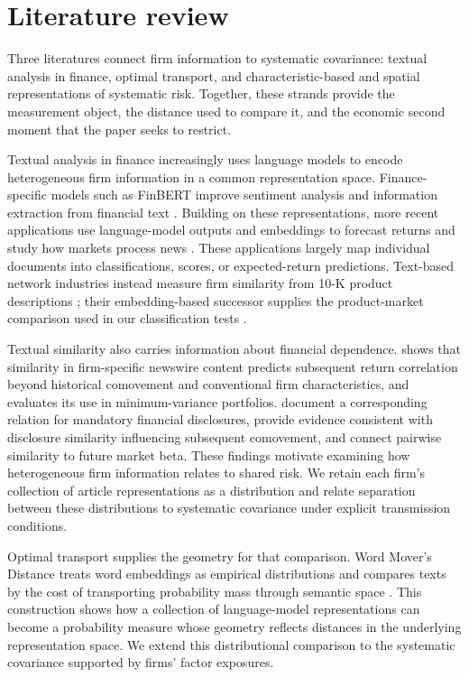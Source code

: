 \section{Literature review}\label{sec:literature}

Three literatures connect firm information to systematic covariance:
textual analysis in finance, optimal transport, and characteristic-based and
spatial representations of systematic risk.
Together, these strands provide the measurement object, the distance used to
compare it, and the economic second moment that the paper seeks to restrict.

Textual analysis in finance increasingly uses language models to encode
heterogeneous firm information in a common representation space.
Finance-specific models such as FinBERT improve sentiment analysis and
information extraction from financial text \citep{huang_finbert_2023}.
Building on these representations, more recent applications use
language-model outputs and embeddings to forecast returns and study how
markets process news \citep{chen_expected_2026,lopezlira_chatgpt_2026}.
These applications largely map individual documents into classifications,
scores, or expected-return predictions.
Text-based network industries instead measure firm similarity from 10-K
product descriptions \citep{hoberg_phillips_2016}; their embedding-based
successor supplies the product-market comparison used in our classification
tests \citep{hoberg2025scope}.

Textual similarity also carries information about financial dependence.
\citet{box2018qualitative} shows that similarity in firm-specific newswire
content predicts subsequent return correlation beyond historical
comovement and conventional firm characteristics, and evaluates its use
in minimum-variance portfolios.
\citet{dyer2024disclosure} document a corresponding relation for mandatory
financial disclosures, provide evidence consistent with disclosure
similarity influencing subsequent comovement, and connect pairwise
similarity to future market beta.
These findings motivate examining how heterogeneous firm information
relates to shared risk.
We retain each firm's collection of article representations as a distribution
and relate separation between these distributions to systematic covariance
under explicit transmission conditions.

Optimal transport supplies the geometry for that comparison.
Word Mover's Distance treats word embeddings as empirical distributions and
compares texts by the cost of transporting probability mass through semantic
space \citep{kusner_word_embeddings_2015}.
This construction shows how a collection of language-model representations
can become a probability measure whose geometry reflects distances in the
underlying representation space.
We extend this distributional comparison to the systematic covariance
supported by firms' factor exposures.

